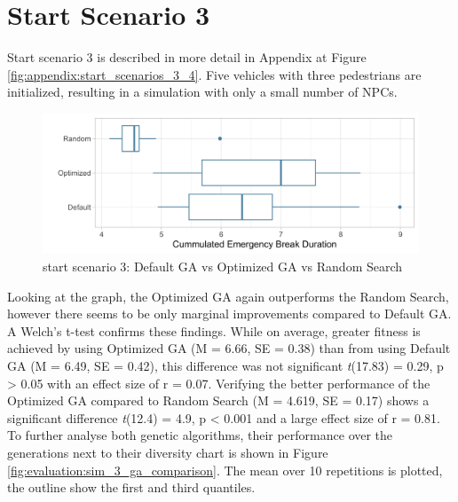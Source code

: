 \section{Start Scenario 3}
\label{sect:evaluation:scenario_3}
Start scenario 3 is described in more detail in Appendix at Figure \ref{fig:appendix:start_scenarios_3_4}. Five vehicles with three pedestrians are initialized, resulting in a simulation with only a small number of NPCs.

\begin{figure}[ht] 
	\includegraphics[width=1\linewidth]{simulations/evaluation/plots/sim_3_comparison}
	\caption{start scenario 3: Default GA vs Optimized GA vs Random Search}
	\label{fig:evaluation:sim_3_comparison}
\end{figure}

Looking at the graph, the Optimized GA again outperforms the Random Search, however there seems to be only marginal improvements compared to Default GA. A Welch's t-test confirms these findings. While on average, greater fitness is achieved by using Optimized GA (M = 6.66, SE = 0.38) than from using Default GA (M = 6.49, SE = 0.42), this difference was not significant \textit{t}(17.83) = 0.29, p > 0.05 with an effect size of r = 0.07. Verifying the better performance of the Optimized GA compared to Random Search (M = 4.619, SE = 0.17) shows a significant difference \textit{t}(12.4) = 4.9, p < 0.001 and a large effect size of r = 0.81. To further analyse both genetic algorithms, their performance over the generations next to their diversity chart is shown in Figure \ref{fig:evaluation:sim_3_ga_comparison}. The mean over 10 repetitions is plotted, the outline show the first and third quantiles.

